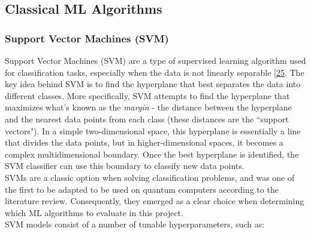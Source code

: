 \documentclass[11pt, oneside]{article}   	%
\begin{document}


\subsection{Classical ML Algorithms}

\hspace{10mm}



\subsubsection{Support Vector Machines (SVM)}

\hspace{10mm}Support Vector Machines (SVM) are a type of supervised learning algorithm used for classification tasks, especially when the data is not linearly separable [\href{https://link.springer.com/book/10.1007/978-1-4757-3264-1}{25}. The key idea behind SVM is to find the hyperplane that best separates the data into different classes. More specifically, SVM attempts to find the hyperplane that maximizes what's known as the \textit{margin} - the distance between the hyperplane and the nearest data points from each class (these distances are the ``support vectors"). In a simple two-dimensional space, this hyperplane is essentially a line that divides the data points, but in higher-dimensional spaces, it becomes a complex multidimensional boundary. Once the best hyperplane is identified, the SVM classifier can use this boundary to classify new data points.\\

\noindent\hspace{10mm}SVMs are a classic option when solving classification problems, and was one of the first to be adapted to be used on quantum computers according to the literature review. Consequently, they emerged as a clear choice when determining which ML algorithms to evaluate in this project. \\

SVM models consist of a number of tunable hyperparameters, such as:
\end{document}
